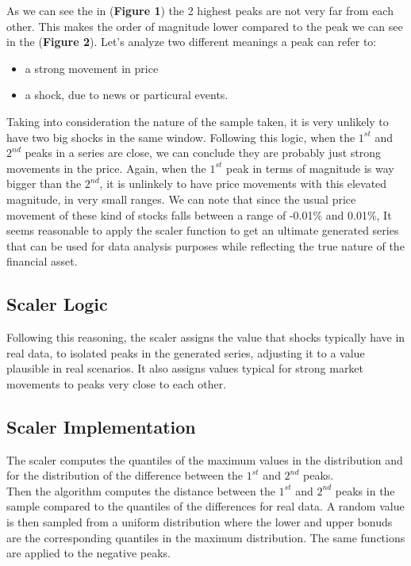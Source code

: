 \documentclass{article}
\begin{document}
\begin{multicols}{2}
    As we can see the in (\textbf{Figure 1}) the 2 highest peaks are not very far from each other. This makes the order of magnitude lower compared to the peak we can see in the (\textbf{Figure 2}). Let's analyze two different meanings a peak can refer to:
    \begin{itemize}
        \item a strong movement in price
        \item a shock, due to news or particural events.
    \end{itemize}  
    Taking into consideration the nature of the sample taken, it is very unlikely to have two big shocks in the same window. Following this logic, when the $1^{st}$ and $2^{nd}$ peaks in a series are close, we can conclude they are probably just strong movements in the price. Again, when the $1^{st}$ peak in terms of magnitude is way bigger than the $2^{nd}$, it is unlinkely to have price movements with this elevated magnitude, in very small ranges. We can note that since the usual price movement of these kind of stocks falls between a range of -0.01\% and 0.01\%, It seems reasonable to apply the scaler function to get an ultimate generated series that can be used for data analysis purposes while reflecting the true nature of the financial asset. 
    \subsection*{Scaler Logic}
    Following this reasoning, the scaler assigns the value that shocks typically have in real data, to isolated peaks in the generated series, adjusting it to a value plausible in real scenarios.
    It also assigns values typical for strong market movements to peaks very close to each other.
    \subsection*{Scaler Implementation}
    The scaler computes the quantiles of the maximum values in the distribution and for the distribution of the difference between the $1^{st}$ and 
    $2^{nd}$ peaks.\\
    Then the algorithm computes the distance between the $1^{st}$ and $2^{nd}$ peaks in the sample compared to the quantiles of the differences for real 
    data. A random value is then sampled from a uniform distribution where the lower and upper bonuds are the corresponding quantiles in the maximum distribution. 
    The same functions are applied to the negative peaks.
    \end{multicols}
\end{document}

